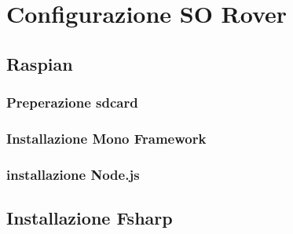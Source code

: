 \chapter{Configurazione SO Rover} 

\section{Raspian}

\subsection{Preperazione sdcard}
 
 

\subsection{Installazione Mono Framework}
 

\subsection{installazione Node.js}
 
\section{Installazione Fsharp}
 
